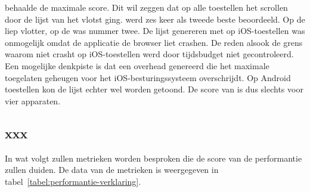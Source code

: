 \st{} behaalde de maximale score.
Dit wil zeggen dat op alle toestellen het scrollen door de lijst van \st{} het vlotst ging.
\jqm{} werd zes keer als tweede beste beoordeeld. 
Op de \htc{} liep \kendo{} vlotter,  op de \ipadi{} was \lungo{} nummer twee.
De lijst genereren met \kendo{} op iOS-toestellen was onmogelijk omdat de applicatie de browser liet crashen.
De reden alsook de grens waarom \kendo{} niet crasht op iOS-toestellen werd door tijdsbudget niet gecontroleerd.
Een mogelijke denkpiste is dat \kendo{} een overhead genereerd die het maximale toegelaten geheugen voor het iOS-besturingssysteem overschrijdt.
Op Android toestellen kon de \kendo{} lijst echter wel worden getoond.
De score van \kendo{} is dus slechts voor vier apparaten.



\subsection{xxx}
\label{sec:evaluatie-performantie-xxx}

In wat volgt zullen metrieken worden besproken die de score van de performantie zullen duiden.
De data van de metrieken is weergegeven in tabel~\ref{tabel:performantie-verklaring}.

\begin{table}[H]
\centering
{}
\caption{Metrieken gebruikt bij de verklaring van performantiecriterium voor \st{}~(\sta), \kendo{}~(\kendoa), \jqm{}~(\jqma) en \lungo{}~(\lungoa).}
\label{tabel:performantie-verklaring}
\end{table}


